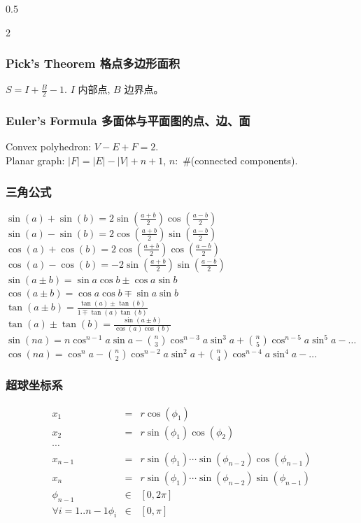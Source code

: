 \begin{small}
\begin{spacing}{0.5}
\begin{multicols*}{2}
\subsubsection*{Pick's Theorem 格点多边形面积}
$S=I+\frac{B}{2}-1.$ $I$ 内部点, $B$ 边界点。
\subsubsection*{Euler's Formula 多面体与平面图的点、边、面}
Convex polyhedron: $V-E+F=2$. \\
Planar graph: $|F|=|E|-|V|+n+1$, $n:$ \#(connected components).
\end{multicols*}
\subsubsection*{三角公式}
\noindent
$
\sin(a) + \sin(b) = 2\sin(\frac{a + b}{2})\cos(\frac{a - b}{2})
$ \\
$
\sin(a) - \sin(b) = 2\cos(\frac{a + b}{2})\sin(\frac{a - b}{2})
$ \\
$
\cos(a) + \cos(b) = 2\cos(\frac{a + b}{2})\cos(\frac{a - b}{2})
$ \\
$
\cos(a) - \cos(b) = -2\sin(\frac{a + b}{2})\sin(\frac{a - b}{2})
$ \\
$
\sin(a \pm b) = \sin a \cos b \pm \cos a \sin b
$ \\
$
\cos(a \pm b) = \cos a \cos b \mp \sin a \sin b
$ \\
$
\tan(a \pm b) = \frac{\tan(a)\pm\tan(b)}{1 \mp \tan(a)\tan(b)}
$ \\
$
\tan(a) \pm \tan(b) = \frac{\sin(a \pm b)}{\cos(a)\cos(b)}
$ \\
$
\sin(na) = n\cos^{n-1}a\sin a - \binom{n}{3}\cos^{n-3}a \sin^3a + \binom{n}{5}\cos^{n-5}a\sin^5a - \dots
$\\
$
\cos(na) = \cos^{n}a - \binom{n}{2}\cos^{n-2}a \sin^2a + \binom{n}{4}\cos^{n-4}a\sin^4a - \dots
$
\subsubsection{超球坐标系}
\begin{eqnarray*}
 	x_1 &=& r\cos(\phi_1) \\ 
	x_2 &=& r\sin(\phi_1)\cos(\phi_2) \\
	\cdots\\
	x_{n-1} &=& r\sin(\phi_1)\cdots\sin(\phi_{n-2})\cos(\phi_{n-1}) \\
	x_n &=& r\sin(\phi_1)\cdots\sin(\phi_{n-2})\sin(\phi_{n-1}) \\
	\phi_{n-1} &\in& [0,2\pi]\\
	\forall {i=1..{n-1}}\phi_i &\in& [0,\pi]\\
\end{eqnarray*}

\end{spacing}
\end{small}
